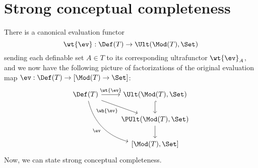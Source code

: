 \section{Strong conceptual completeness}
 There is a canonical evaluation functor $$ \wt{\ev} : \Def(T) \to \Ult(\Mod(T), \Set) $$ sending each definable set $A \in T$ to its corresponding ultrafunctor $\wt{\ev}_A$, and we now have the following picture of factorizations of the original evaluation map $\ev : \Def(T) \to [\Mod(T) \to \Set]$:
  $$
  \begin{tikzcd}[ampersand replacement = \&]
  \Def(T) \arrow[swap, bend right]{ddr}{\ev} \arrow[swap]{dr}{\wh{\ev}} \arrow{r}{\wt{\ev}} \& \Ult(\Mod(T),\Set) \arrow[hook]{d} \\
    \& \PUlt(\Mod(T),\Set) \arrow{d} \\
    \& \left[\Mod(T), \Set\right]
    \end{tikzcd}
  $$
  Now, we can state strong conceptual completeness.
  
  


  
  
